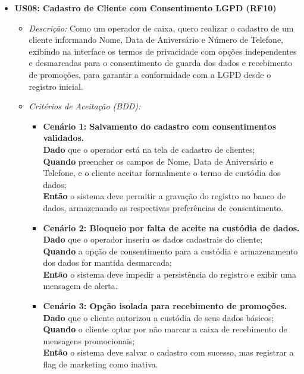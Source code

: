 \documentclass[
	12pt,				%
	openany,			%
	oneside,			%
	a4paper,			%
	english,			%
	french,				%
	spanish,			%
	brazil				%
	]{abntex2}
\begin{document}
\begin{itemize}
   \item \textbf{US08: Cadastro de Cliente com Consentimento LGPD (RF10)}
    \begin{itemize}
        \item \textit{Descrição:} Como um operador de caixa, quero realizar o cadastro de um cliente informando Nome, Data de Aniversário e Número de Telefone, exibindo na interface os termos de privacidade com opções independentes e desmarcadas para o consentimento de guarda dos dados e recebimento de promoções, para garantir a conformidade com a LGPD desde o registro inicial.
        \item \textit{Critérios de Aceitação (BDD):}
        \begin{itemize}
            \item \textbf{Cenário 1: Salvamento do cadastro com consentimentos validados.} \\
            \textbf{Dado} que o operador está na tela de cadastro de clientes; \\
            \textbf{Quando} preencher os campos de Nome, Data de Aniversário e Telefone, e o cliente aceitar formalmente o termo de custódia dos dados; \\
            \textbf{Então} o sistema deve permitir a gravação do registro no banco de dados, armazenando as respectivas preferências de consentimento.
            \item \textbf{Cenário 2: Bloqueio por falta de aceite na custódia de dados.} \\
            \textbf{Dado} que o operador inseriu os dados cadastrais do cliente; \\
            \textbf{Quando} a opção de consentimento para a custódia e armazenamento dos dados for mantida desmarcada; \\
            \textbf{Então} o sistema deve impedir a persistência do registro e exibir uma mensagem de alerta.
            \item \textbf{Cenário 3: Opção isolada para recebimento de promoções.} \\
            \textbf{Dado} que o cliente autorizou a custódia de seus dados básicos; \\
            \textbf{Quando} o cliente optar por não marcar a caixa de recebimento de mensagens promocionais; \\
            \textbf{Então} o sistema deve salvar o cadastro com sucesso, mas registrar a flag de marketing como inativa.
        \end{itemize}
    \end{itemize}


\end{itemize}
\end{document}
